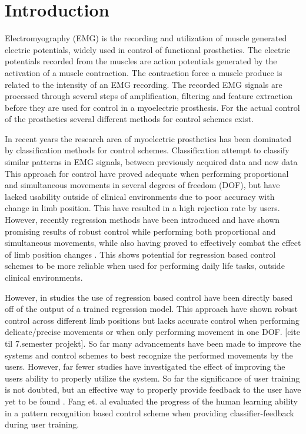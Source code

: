 
\section{Introduction}			%

Electromyography (EMG) is the recording and utilization of muscle generated electric potentials, widely used in control of functional prosthetics. The electric potentials recorded from the muscles are action potentials generated by the activation of a muscle contraction. The contraction force a muscle produce is related to the intensity of an EMG recording. The recorded EMG signals are processed through several steps of amplification, filtering and feature extraction before they are used for control in a myoelectric prosthesis. \cite{Cram2012, Fougner2012} For the actual control of the prosthetics several different methods for control schemes exist.

In recent years the research area of myoelectric prosthetics has been dominated by classification methods for control schemes. Classification attempt to classify similar patterns in EMG signals, between previously acquired data and new data \cite{Mendez2017} This approach for control have proved adequate when performing proportional and simultaneous movements in several degrees of freedom (DOF), but have lacked usability outside of clinical environments due to poor accuracy with change in limb position. This have resulted in a high rejection rate by users. 
However, recently regression methods have been introduced and have shown promising results of robust control while performing both proportional and simultaneous movements, while also having proved to effectively combat the effect of limb position changes \cite{Hwang2017, Hanhe2014}. This shows potential for regression based control schemes to be more reliable when used for performing daily life tasks, outside clinical environments.

However, in studies the use of regression based control have been directly based off of the output of a trained regression model. This approach have shown robust control across different limb positions but lacks accurate control when performing delicate/precise movements or when only performing movement in one DOF. [cite til 7.semester projekt]. So far many advancements have been made to improve the systems and control schemes to best recognize the performed movements by the users. However, far fewer studies have investigated the effect of improving the users ability to properly utilize the system. So far the significance of user training is not doubted, but an effective way to properly provide feedback to the user have yet to be found \cite{Fang2017}. Fang et. al \cite{Fang2017} evaluated the progress of the human learning ability in a pattern recognition based control scheme when providing classifier-feedback during user training.

